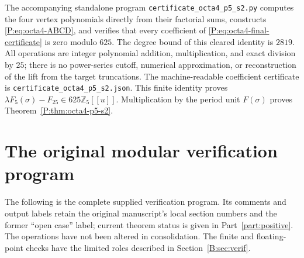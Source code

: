 \documentclass[11pt,a4paper]{article}
\theoremstyle{definition}\newtheorem{definition}[theorem]{Definition}
\theoremstyle{remark}\newtheorem{remark}[theorem]{Remark}
\numberwithin{equation}{section}
\begin{document}
The accompanying standalone program
\texttt{certificate\_octa4\_p5\_s2.py} computes the four vertex
polynomials directly from their factorial sums, constructs
\eqref{P:eq:octa4-ABCD}, and verifies that every coefficient of
\eqref{P:eq:octa4-final-certificate} is zero modulo \(625\).
The degree bound of this cleared identity is \(2819\).
All operations are integer polynomial addition, multiplication,
and exact division by \(25\); there is no power-series cutoff,
numerical approximation, or reconstruction of the lift from
the target truncations.  The machine-readable coefficient
certificate is \texttt{certificate\_octa4\_p5\_s2.json}.
This finite identity proves \(\lambda F_5(\sigma)-F_{25}\in
625\mathbb Z_5[[u]]\).  Multiplication by the period unit
\(F(\sigma)\) proves Theorem~\ref{P:thm:octa4-p5-s2}.




\clearpage
\section{The original modular verification program}\label{B:source-appendix-1}\label{B:app:script}
The following is the complete supplied verification program. Its comments and output labels retain the original manuscript's local section numbers and the former ``open case'' label; current theorem status is given in Part~\ref{part:positive}. The operations have not been altered in consolidation. The finite and floating-point checks have the limited roles described in Section~\ref{B:sec:verif}.
\end{document}
